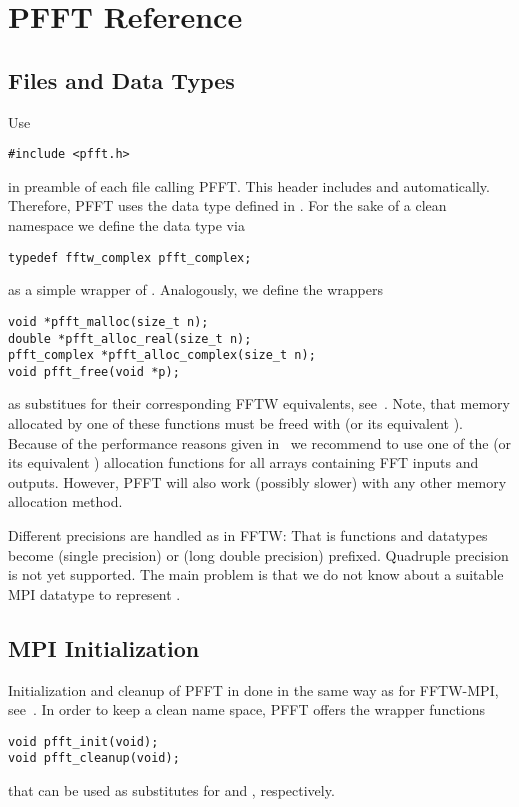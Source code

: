 \chapter{PFFT Reference}\label{chap:ref}

\section{Files and Data Types}
Use
\begin{lstlisting}
#include <pfft.h>
\end{lstlisting}
in preamble of each file calling PFFT. This header includes  and  automatically.
Therefore, PFFT uses the  data type defined in . For the sake of a clean namespace we
define the data type  via
\begin{lstlisting}
typedef fftw_complex pfft_complex;
\end{lstlisting}
as a simple wrapper of .
Analogously, we define the wrappers
\begin{lstlisting}
void *pfft_malloc(size_t n);
double *pfft_alloc_real(size_t n);
pfft_complex *pfft_alloc_complex(size_t n);
void pfft_free(void *p);
\end{lstlisting}
as substitues for their corresponding FFTW equivalents, see~\cite{fftw-malloc}. Note, that memory allocated by one
of these functions must be freed with  (or its equivalent ).
Because of the performance reasons given in~\cite{fftw-align-mem}
we recommend to use one of the  (or its equivalent ) allocation functions
for all arrays containing FFT inputs and outputs.
However, PFFT will also work (possibly slower) with any other memory allocation method.

Different precisions are handled as in FFTW: That is  functions and datatypes become  (single precision)
or  (long double precision) prefixed. Quadruple precision is not yet supported. 
The main problem is that we do not know about a suitable MPI datatype to represent .

\section{MPI Initialization}
Initialization and cleanup of PFFT in done in the same way as for FFTW-MPI, see~\cite{fftw-mpi-init}.
In order to keep a clean name space, PFFT offers the wrapper functions 
\begin{lstlisting}
void pfft_init(void);
void pfft_cleanup(void);
\end{lstlisting}
that can be used as substitutes for  and , respectively.

